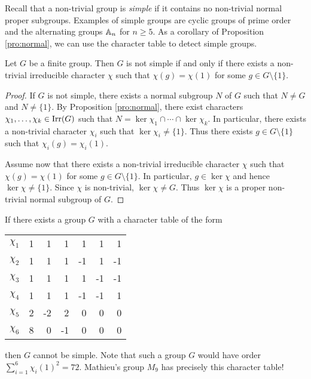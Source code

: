 Recall that a non-trivial group is \emph{simple} if it contains no non-trivial normal 
proper subgroups. Examples of simple groups are cyclic groups of prime order
and the alternating groups $\mathbb{A}_n$ for $n\geq5$. 
As a corollary of Proposition \ref{pro:normal}, 
we can use the character table to detect simple groups.

\begin{proposition}
    Let $G$ be a finite group. Then $G$ is not simple if and only if 
    there exists a non-trivial irreducible character $\chi$ such that
    $\chi(g)=\chi(1)$ 
    for some $g\in G\setminus\{1\}$. 
\end{proposition}

\begin{proof}
    If $G$ is not simple, there exists a normal subgroup $N$ of $G$ such that
    $N\ne G$ and $N\ne\{1\}$. 
    By Proposition \ref{pro:normal}, there exist characters 
    $\chi_1,\dots,\chi_k\in\operatorname{Irr}(G)$
    such that 
    $N=\ker\chi_1\cap\cdots\cap\ker\chi_k$.
    In particular, there exists a non-trivial character
    $\chi_i$ such that $\ker\chi_i\ne\{1\}$. Thus 
    there exists $g\in G\setminus\{1\}$ such that
    $\chi_i(g)=\chi_i(1)$. 
    
    Assume now that there exists a non-trivial irreducible character $\chi$ 
    such that $\chi(g)=\chi(1)$ for some $g\in G\setminus\{1\}$. In particular, $g\in\ker\chi$ 
    and hence $\ker\chi\ne\{1\}$. Since $\chi$ is non-trivial, $\ker\chi\ne G$. 
    Thus $\ker\chi$ is a proper non-trivial normal subgroup of $G$.
\end{proof}

\begin{example}
    If there exists a group $G$ with
    a character table 
    of the form
    \begin{center}
		\begin{tabular}{|c|rrrrrr|}
			\hline
			$\chi_{1}$ & 1 & 1 & 1 & 1 & 1 & 1\tabularnewline
			$\chi_{2}$ & 1 & 1 & 1 & -1 & 1 & -1 \tabularnewline
			$\chi_{3}$ & 1 & 1 & 1 & 1 & -1 & -1\tabularnewline
		    $\chi_{4}$ & 1 & 1 & 1 & -1 & -1 & 1\tabularnewline
			$\chi_{5}$ & 2 & -2 & 2 & 0 & 0 & 0\tabularnewline
			$\chi_{6}$ & 8 & 0 & -1 & 0 & 0 & 0\tabularnewline
			\hline
		\end{tabular}
	\end{center}
	then $G$ cannot be simple. Note that such a group $G$ would have order $\sum_{i=1}^6\chi_i(1)^2=72$. 
	Mathieu's group $M_{9}$ has precisely this character table! 
\end{example}

